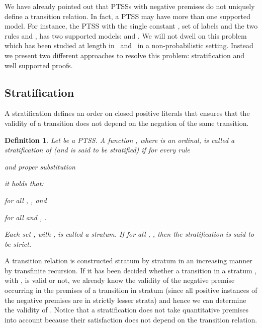 \documentclass[submission,copyright,creativecommons]{eptcs}
\newtheorem{definition}{Definition}
\begin{document}
We have already pointed out that PTSSs with negative premises do not
uniquely define a transition relation.  In fact, a PTSS may have more
than one supported model.  For instance, the PTSS with the single
constant , set of labels  and the two rules
 and
,
has two supported models:  and
.
We will not dwell on this problem which has been studied at length
in~\cite{BolGroote96} and~\cite{vanGlabbeek04} in a non-probabilistic
setting.
Instead we present two different approaches to resolve this problem:
stratification and well supported proofs. 



\subsection{Stratification}\label{sec:stratification}
A stratification defines an order on closed positive literals that
ensures that the validity of a transition does
not depend on the negation of the same transition.

\begin{definition}\label{def:stratification}Let  be a PTSS.  A function , where  is an ordinal, is called a
  \emph{stratification} of  (and  is said to be
  \emph{stratified}) if for every rule

and proper substitution

it holds that:
\begin{inparaenum}[(i)]
  \item for all , , and
  \item for all  and , .
  \end{inparaenum}
Each set , with
  , is called a \emph{stratum}.
If for all , ,
  then the stratification is said to be \emph{strict}.
\end{definition}

A transition relation is constructed stratum by stratum in an
increasing manner by transfinite recursion.  
If it has been decided whether a
transition in a stratum , with , is valid or
not, we already know the validity of the negative premise occurring in
the premises of a transition  in stratum  (since all
positive instances of the negative premises are in strictly lesser
strata) and hence we can determine the validity of .
Notice that a stratification does not take quantitative premises into account because 
their satisfaction does not depend on the transition relation.
\end{document}
